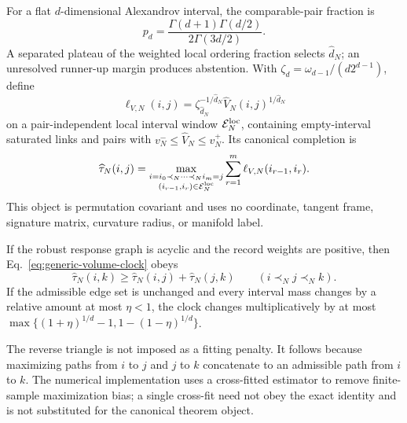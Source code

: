 For a flat \(d\)-dimensional Alexandrov interval, the comparable-pair
fraction is
\begin{equation}
 p_d=\frac{\Gamma(d+1)\Gamma(d/2)}{2\Gamma(3d/2)} .
 \label{eq:generic-myrheim-meyer}
\end{equation}
A separated plateau of the weighted local ordering fraction selects
\(\widehat d_N\); an unresolved runner-up margin produces abstention.  With
\(\zeta_d=\omega_{d-1}/(d2^{d-1})\), define
\begin{equation}
 \ell_{V,N}(i,j)
 =\zeta_{\widehat d_N}^{-1/\widehat d_N}
 \widehat V_N(i,j)^{1/\widehat d_N}
 \label{eq:generic-local-volume-clock}
\end{equation}
on a pair-independent local interval window
\(\mathcal E_N^{\rm loc}\), containing empty-interval saturated links and
pairs with \(v_N^-\le\widehat V_N\le v_N^+\).  Its canonical completion is
\begin{equation}
 \widehat\tau_N(i,j)
 =\max_{\substack{i=i_0\prec_N\cdots\prec_N i_m=j\\
                  (i_{r-1},i_r)\in\mathcal E_N^{\rm loc}}}
 \sum_{r=1}^{m}\ell_{V,N}(i_{r-1},i_r).
 \label{eq:generic-volume-clock}
\end{equation}
This object is permutation covariant and uses no coordinate, tangent frame,
signature matrix, curvature radius, or manifold label.

\begin{theorem}
\label{thm:generic-finite-order-volume}
If the robust response graph is acyclic and the record weights are positive,
then Eq.~\eqref{eq:generic-volume-clock} obeys
\begin{equation}
 \widehat\tau_N(i,k)\ge
 \widehat\tau_N(i,j)+\widehat\tau_N(j,k)
 \qquad(i\prec_N j\prec_N k).
 \label{eq:generic-reverse-triangle}
\end{equation}
If the admissible edge set is unchanged and every interval mass changes by a
relative amount at most \(\eta<1\), the clock changes multiplicatively by at
most
\(\max\{(1+\eta)^{1/d}-1,1-(1-\eta)^{1/d}\}\).
\end{theorem}

The reverse triangle is not imposed as a fitting penalty.  It follows because
maximizing paths from \(i\) to \(j\) and \(j\) to \(k\) concatenate to an
admissible path from \(i\) to \(k\).  The numerical implementation uses a
cross-fitted estimator to remove finite-sample maximization bias; a single
cross-fit need not obey the exact identity and is not substituted for the
canonical theorem object.

